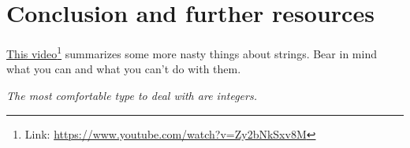 \section{Conclusion and further resources}

\href{https://www.youtube.com/watch?v=Zy2bNkSxv8M}{This video}\footnote{Link: \href{https://www.youtube.com/watch?v=Zy2bNkSxv8M}{https://www.youtube.com/watch?v=Zy2bNkSxv8M}} summarizes some more nasty things about strings. Bear in mind what you can and what you can't do with them.
\vspace{6mm}

\begin{center}
\textit{The most comfortable type to deal with are integers.}
\end{center}
